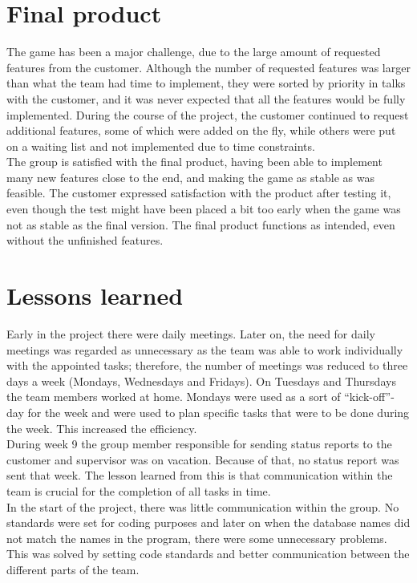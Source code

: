 \section{Final product}

The game has been a major challenge, due to the large amount of requested features from the customer. Although the number of requested features was larger than what the team had time to implement, they were sorted by priority in talks with the customer, and it was never expected that all the features would be fully implemented. During the course of the project, the customer continued to request additional features, some of which were added on the fly, while others were put on a waiting list and not implemented due to time constraints.\\
\newline
The group is satisfied with the final product, having been able to implement many new features close to the end, and making the game as stable as was feasible. The customer expressed satisfaction with the product after testing it, even though the test might have been placed a bit too early when the game was not as stable as the final version. The final product functions as intended, even without the unfinished features.\\

\section{Lessons learned}


Early in the project there were daily meetings. Later on, the need for daily meetings was regarded as unnecessary as the team was able to work individually with the appointed tasks; therefore, the number of meetings was reduced to three days a week (Mondays, Wednesdays and Fridays). On Tuesdays and Thursdays the team members worked at home. Mondays were used as a sort of “kick-off”-day for the week and were used to plan specific tasks that were to be done during the week. This increased the efficiency.\\
\newline
During week 9 the group member responsible for sending status reports to the customer and supervisor was on vacation. Because of that, no status report was sent that week. The lesson learned from this is that communication within the team is crucial for the completion of all tasks in time.\\
\newline
In the start of the project, there was little communication within the group. No standards were set
for coding purposes and later on when the database names did not match the names in the program, there were some unnecessary problems. This was solved by setting code standards and better communication between the different parts of the team. \\
